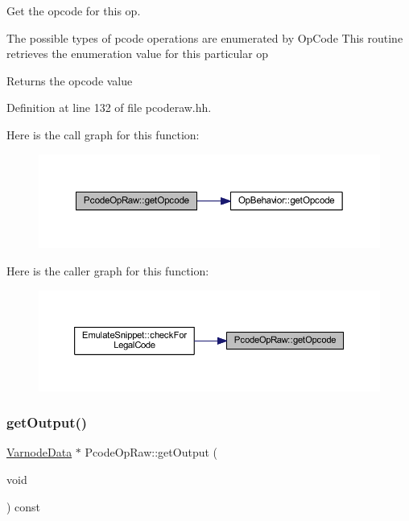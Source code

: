 Get the opcode for this op. 

The possible types of pcode operations are enumerated by Op\+Code This routine retrieves the enumeration value for this particular op \begin{DoxyReturn}{Returns}
the opcode value 
\end{DoxyReturn}


Definition at line 132 of file pcoderaw.\+hh.

Here is the call graph for this function\+:
\nopagebreak
\begin{figure}[H]
\begin{center}
\leavevmode
\includegraphics[width=350pt]{class_pcode_op_raw_a6c8a73aa191303dfb59ea23acf9edd42_cgraph}
\end{center}
\end{figure}
Here is the caller graph for this function\+:
\nopagebreak
\begin{figure}[H]
\begin{center}
\leavevmode
\includegraphics[width=350pt]{class_pcode_op_raw_a6c8a73aa191303dfb59ea23acf9edd42_icgraph}
\end{center}
\end{figure}
\mbox{\label{class_pcode_op_raw_a74d17c5335e043ff228c1c5f5e97cd74}} 
\subsubsection{\texorpdfstring{getOutput()}{getOutput()}}
{\footnotesize\ttfamily \mbox{\hyperlink{struct_varnode_data}{Varnode\+Data}} $\ast$ Pcode\+Op\+Raw\+::get\+Output (\begin{DoxyParamCaption}\item[{void}]{ }\end{DoxyParamCaption}) const\hspace{0.3cm}{\ttfamily [inline]}}



